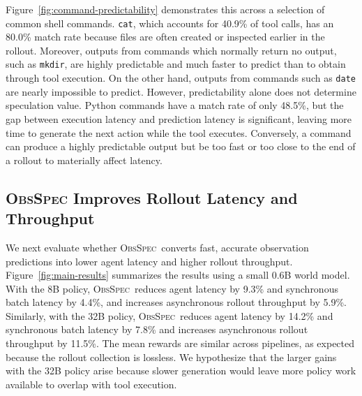 \documentclass{article} %
\newcommand{\method}{\textsc{ObsSpec}}
\begin{document}
Figure~\ref{fig:command-predictability} demonstrates this across a selection of common shell commands. \texttt{cat}, which accounts for 40.9\% of tool calls, has an 80.0\% match rate because files are often created or inspected earlier in the rollout. Moreover, outputs from commands which normally return no output, such as \texttt{mkdir}, are highly predictable and much faster to predict than to obtain through tool execution. On the other hand, outputs from commands such as \texttt{date} are nearly impossible to predict. However, predictability alone does not determine speculation value. Python commands have a match rate of only 48.5\%, but the gap between execution latency and prediction latency is significant, leaving more time to generate the next action while the tool executes. Conversely, a command can produce a highly predictable output but be too fast or too close to the end of a rollout to materially affect latency.

\subsection{\method{} Improves Rollout Latency and Throughput}
\label{sec:main-results}

We next evaluate whether \method\ converts fast, accurate observation predictions into lower agent latency and higher rollout throughput. Figure~\ref{fig:main-results} summarizes the results using a small 0.6B world model. With the 8B policy, \method\ reduces agent latency by 9.3\% and synchronous batch latency by 4.4\%, and increases asynchronous rollout throughput by 5.9\%. Similarly, with the 32B policy, \method\ reduces agent latency by 14.2\% and synchronous batch latency by 7.8\% and increases asynchronous rollout throughput by 11.5\%. The mean rewards are similar across pipelines, as expected because the rollout collection is lossless. We hypothesize that the larger gains with the 32B policy arise because slower generation would leave more policy work available to overlap with tool execution.
\end{document}
